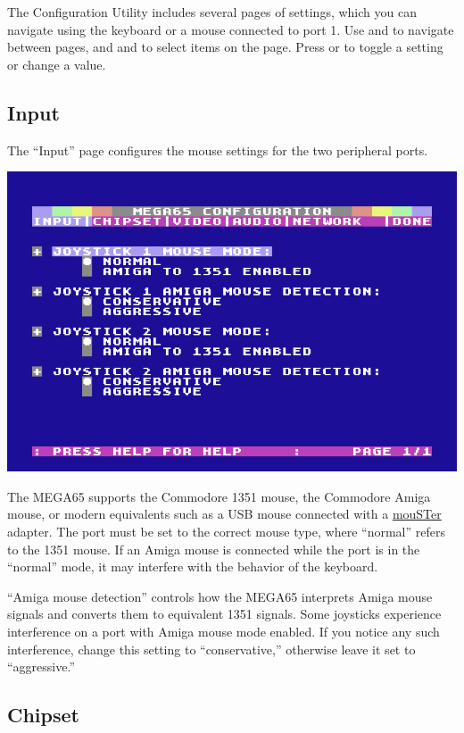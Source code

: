 The Configuration Utility includes several pages of settings, which you can navigate using the keyboard or a mouse connected to port 1. Use \megakey{$\leftarrow$} and \megakey{$\rightarrow$} to navigate between pages, and \megakey{$\uparrow$} and \megakey{$\downarrow$} to select items on the page. Press  or  to toggle a setting or change a value.

\subsection{Input}

The ``Input'' page configures the mouse settings for the two peripheral ports.

\begin{center}
  \includegraphics[width=0.7\linewidth]{images/ss-m65config-1.png}
\end{center}

The MEGA65 supports the Commodore 1351 mouse, the Commodore Amiga mouse, or modern equivalents such as a USB mouse connected with a \href{https://retrohax.net/shop/amiga/mouster/}{mouSTer} adapter. The port must be set to the correct mouse type, where ``normal'' refers to the 1351 mouse. If an Amiga mouse is connected while the port is in the ``normal'' mode, it may interfere with the behavior of the keyboard.

``Amiga mouse detection'' controls how the MEGA65 interprets Amiga mouse signals and converts them to equivalent 1351 signals. Some joysticks experience interference on a port with Amiga mouse mode enabled. If you notice any such interference, change this setting to ``conservative,'' otherwise leave it set to ``aggressive.''

\subsection{Chipset}

